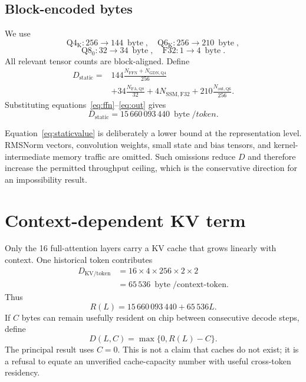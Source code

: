 \documentclass[11pt,a4paper]{article}
\newcommand{\bytes}{\operatorname{byte}}
\begin{document}
\subsection{Block-encoded bytes}
We use
\[
\mathrm{Q4_K}:256\to144\ \bytes,
\quad
\mathrm{Q6_K}:256\to210\ \bytes,
\]
\[
\mathrm{Q8_0}:32\to34\ \bytes,
\quad
\mathrm{F32}:1\to4\ \bytes.
\]
All relevant tensor counts are block-aligned. Define
\begin{equation}
\begin{aligned}
D_{\mathrm{static}}
={}&144\frac{N_{\mathrm{FFN}}+N_{\mathrm{GDN,Q4}}}{256}\\
&+34\frac{N_{\mathrm{FA,Q8}}}{32}
+4N_{\mathrm{SSM,F32}}
+210\frac{N_{\mathrm{out,Q6}}}{256}.
\end{aligned}
\label{eq:static}
\end{equation}
Substituting equations~\eqref{eq:ffn}--\eqref{eq:out} gives
\begin{equation}
  \boxed{D_{\mathrm{static}}=15\,660\,093\,440\ \bytes/token}.
  \label{eq:staticvalue}
\end{equation}

Equation~\eqref{eq:staticvalue} is deliberately a lower bound at the representation level. RMSNorm vectors, convolution weights, small state and bias tensors, and kernel-intermediate memory traffic are omitted. Such omissions reduce $D$ and therefore increase the permitted throughput ceiling, which is the conservative direction for an impossibility result.

\section{Context-dependent KV term}

Only the 16 full-attention layers carry a KV cache that grows linearly with context. One historical token contributes
\begin{equation}
\begin{aligned}
D_{\mathrm{KV/token}}
&=16\times4\times256\times2\times2\\
&=65\,536\ \bytes/\text{context-token}.
\end{aligned}
\label{eq:kv}
\end{equation}
Thus
\begin{equation}
  R(L)=15\,660\,093\,440+65\,536L.
  \label{eq:R}
\end{equation}
If $C$ bytes can remain usefully resident on chip between consecutive decode steps, define
\begin{equation}
  D(L,C)=\max\{0,R(L)-C\}.
  \label{eq:D}
\end{equation}
The principal result uses $C=0$. This is not a claim that caches do not exist; it is a refusal to equate an unverified cache-capacity number with useful cross-token residency.
\end{document}
